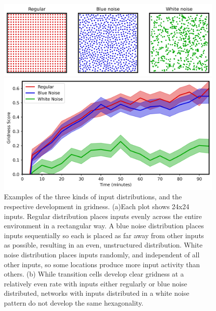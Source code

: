 \documentclass{article}
\begin{document}
    \begin{figure}[H]
        \centering
        \begin{minipage}[t]{\linewidth}
            \centering 
            \subcaption{}
            \hspace*{0.06\linewidth}\includegraphics[width=0.83\linewidth]{distribution_plot.png}
        \end{minipage}
        \begin{minipage}[t]{\linewidth}
            \centering
            \subcaption{}
            \includegraphics[width=0.9\linewidth]{gscore_line_plot.png}
        \end{minipage}
        \caption{Examples of the three kinds of input distributions, and the respective development in gridness. (a)Each plot shows 24x24 inputs. Regular distribution places inputs evenly across the entire environment in a rectangular way. A blue noise distribution places inputs sequentially so each is placed as far away from other inputs as possible, resulting in an even, unstructured distribution. White noise distribution places inputs randomly, and independent of all other inputs, so some locations produce more input activity than others. (b) While transition cells develop clear gridness at a relatively even rate with inputs either regularly or blue noise distributed, networks with inputs distributed in a white noise pattern do not develop the same hexagonality.} 
        \label{distribution_plot}
    \end{figure}
\end{document}
